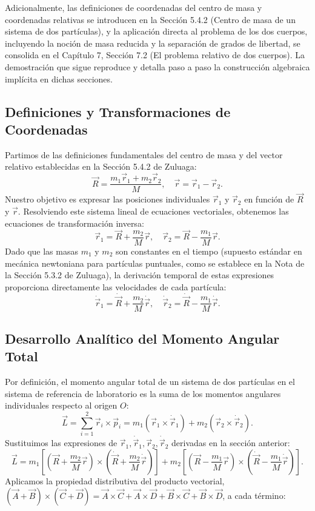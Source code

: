 \documentclass[12pt, a4paper]{article}
\begin{document}
Adicionalmente, las definiciones de coordenadas del centro de masa y coordenadas relativas se introducen en la Sección 5.4.2 (Centro de masa de un sistema de dos partículas), y la aplicación directa al problema de los dos cuerpos, incluyendo la noción de masa reducida y la separación de grados de libertad, se consolida en el Capítulo 7, Sección 7.2 (El problema relativo de dos cuerpos). La demostración que sigue reproduce y detalla paso a paso la construcción algebraica implícita en dichas secciones.

\subsection{Definiciones y Transformaciones de Coordenadas}
Partimos de las definiciones fundamentales del centro de masa y del vector relativo establecidas en la Sección 5.4.2 de Zuluaga:
$$ \vec{R} = \frac{m_1 \vec{r}_1 + m_2 \vec{r}_2}{M}, \quad \vec{r} = \vec{r}_1 - \vec{r}_2. $$
Nuestro objetivo es expresar las posiciones individuales $\vec{r}_1$ y $\vec{r}_2$ en función de $\vec{R}$ y $\vec{r}$. Resolviendo este sistema lineal de ecuaciones vectoriales, obtenemos las ecuaciones de transformación inversa:
$$ \vec{r}_1 = \vec{R} + \frac{m_2}{M} \vec{r}, \quad \vec{r}_2 = \vec{R} - \frac{m_1}{M} \vec{r}. $$
Dado que las masas $m_1$ y $m_2$ son constantes en el tiempo (supuesto estándar en mecánica newtoniana para partículas puntuales, como se establece en la Nota de la Sección 5.3.2 de Zuluaga), la derivación temporal de estas expresiones proporciona directamente las velocidades de cada partícula:
$$ \dot{\vec{r}}_1 = \dot{\vec{R}} + \frac{m_2}{M} \dot{\vec{r}}, \quad \dot{\vec{r}}_2 = \dot{\vec{R}} - \frac{m_1}{M} \dot{\vec{r}}. $$

\subsection{Desarrollo Analítico del Momento Angular Total}
Por definición, el momento angular total de un sistema de dos partículas en el sistema de referencia de laboratorio es la suma de los momentos angulares individuales respecto al origen $O$:
$$ \vec{L} = \sum_{i=1}^2 \vec{r}_i \times \vec{p}_i = m_1 \left( \vec{r}_1 \times \dot{\vec{r}}_1 \right) + m_2 \left( \vec{r}_2 \times \dot{\vec{r}}_2 \right). $$
Sustituimos las expresiones de $\vec{r}_1, \dot{\vec{r}}_1, \vec{r}_2, \dot{\vec{r}}_2$ derivadas en la sección anterior:
$$ \vec{L} = m_1 \left[ \left( \vec{R} + \frac{m_2}{M} \vec{r} \right) \times \left( \dot{\vec{R}} + \frac{m_2}{M} \dot{\vec{r}} \right) \right] + m_2 \left[ \left( \vec{R} - \frac{m_1}{M} \vec{r} \right) \times \left( \dot{\vec{R}} - \frac{m_1}{M} \dot{\vec{r}} \right) \right]. $$
Aplicamos la propiedad distributiva del producto vectorial, $(\vec{A}+\vec{B}) \times (\vec{C}+\vec{D}) = \vec{A}\times\vec{C} + \vec{A}\times\vec{D} + \vec{B}\times\vec{C} + \vec{B}\times\vec{D}$, a cada término:
\end{document}
